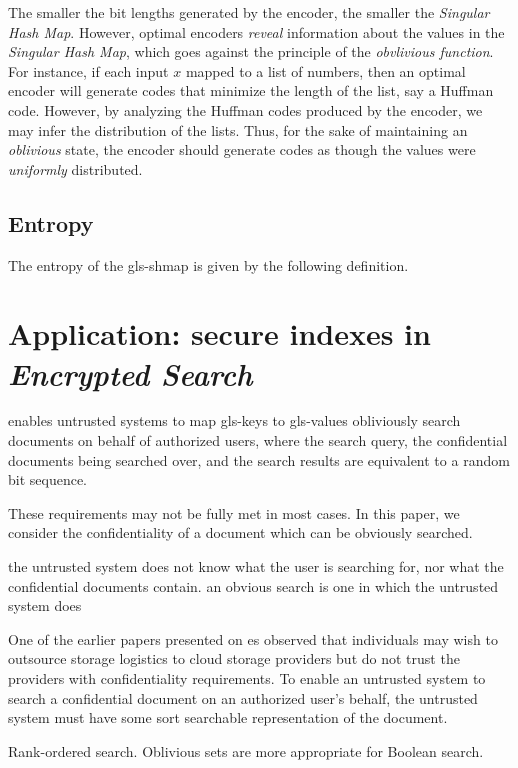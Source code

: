 \documentclass{article}
\begin{document}
The smaller the bit lengths generated by the encoder, the smaller the \emph{Singular Hash Map}. However, optimal encoders \emph{reveal} information about the values in the \emph{Singular Hash Map}, which goes against the principle of the \emph{obvlivious function}. For instance, if each input $x$ mapped to a list of numbers, then an optimal encoder will generate codes that minimize the length of the list, say a Huffman code. However, by analyzing the Huffman codes produced by the encoder, we may infer the distribution of the lists. Thus, for the sake of maintaining an \emph{oblivious} state, the encoder should generate codes as though the values were \emph{uniformly} distributed.

\subsection{Entropy}
The entropy of the \gls{gls-shmap} is given by the following definition.



\section{Application: secure indexes in \emph{Encrypted Search}}
enables untrusted systems to map \glspl{gls-key} to \glspl{gls-value}
obliviously search documents on behalf of authorized users, where the search query, the confidential documents being searched over, and the search results are equivalent to a random bit sequence.

These requirements may not be fully met in most cases. In this paper, we consider the confidentiality of a document which can be obviously searched.

the untrusted system does not know what the user is searching for, nor what the confidential documents contain. an obvious search is one in which the untrusted system does

One of the earlier papers presented on \gls{es} \cite{Son00} observed that individuals may wish to outsource storage logistics to cloud storage providers but do not trust the providers with confidentiality requirements. 
To enable an untrusted system to search a confidential document on an authorized user's behalf, the untrusted system must have some sort searchable representation of the document. 

Rank-ordered search. Oblivious sets are more appropriate for Boolean search.
\end{document}
